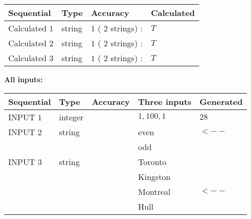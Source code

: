 \documentclass[12pt]{article}
\begin{document}
   
   
   
\noindent{}
   
   
  
  
\noindent\begin{tabular}{|l|l|l|l|}
\hline
 Sequential & Type & Accuracy & Calculated \\ 
\hline
 
 
  Calculated $           1$ & string & $           1 $ ( $          2 $ strings)
 : 
 & $T$
 \\  \hline  
 
 
  Calculated $           2$ & string & $           1 $ ( $          2 $ strings)
 : 
 & $T$
 \\  \hline  
 
 
  Calculated $           3$ & string & $           1 $ ( $          2 $ strings)
 : 
 & $T$
 \\  \hline  
 \end{tabular}
   
   
   
   
\noindent\vspace{0.1in}\hspace{-0.08in} {\textbf{\Large{All inputs: }}}
   
   
  
  
\noindent\begin{tabular}{|l|l|l|l|l|}
\hline
 Sequential & Type & Accuracy & Three inputs & Generated \\ 
\hline
 
 
  INPUT $           1$ & integer &  & $
 1
 , 
 100
 , 
 1
 $ & $ 28 $ 
 \\  \hline  
 
 
  INPUT $           2$ & string & & 
 even & 
  $ <-- $ 
  \\
  & & & 
 odd & 
 \\  \hline  
 
 
  INPUT $           3$ & string & & 
 Toronto & 
  \\
  & & & 
 Kingston & 
  \\
  & & & 
 Montreal & 
  $ <-- $ 
  \\
  & & & 
 Hull & 
 \\  \hline  
 \end{tabular}
   
   
  
\end{document}
